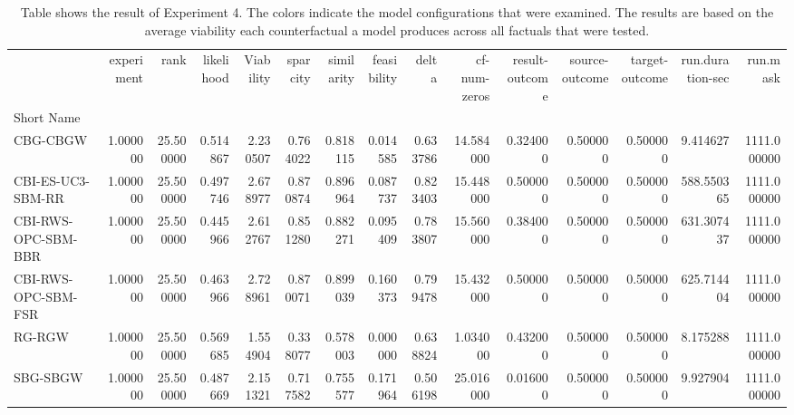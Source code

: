 \begin{table}
\caption{Table shows the result of Experiment 4. The colors indicate the model configurations that were examined. The results are based on the average viability each counterfactual a model produces across all factuals that were tested.}
\label{tbl:exp4-winner}
\begin{tabular}{lrrrrrrrrrrrrrr}
 & experiment & rank & likelihood & Viability & sparcity & similarity & feasibility & delta & cf-num-zeros & result-outcome & source-outcome & target-outcome & run.duration-sec & run.mask \\
Short Name &  &  &  &  &  &  &  &  &  &  &  &  &  &  \\
CBG-CBGW & 1.000000 & 25.500000 & 0.514867 & 2.230507 & 0.764022 & 0.818115 & 0.014585 & 0.633786 & 14.584000 & 0.324000 & 0.500000 & 0.500000 & 9.414627 & 1111.000000 \\
CBI-ES-UC3-SBM-RR & 1.000000 & 25.500000 & 0.497746 & 2.678977 & 0.870874 & 0.896964 & 0.087737 & 0.823403 & 15.448000 & 0.500000 & 0.500000 & 0.500000 & 588.550365 & 1111.000000 \\
CBI-RWS-OPC-SBM-BBR & 1.000000 & 25.500000 & 0.445966 & 2.612767 & 0.851280 & 0.882271 & 0.095409 & 0.783807 & 15.560000 & 0.384000 & 0.500000 & 0.500000 & 631.307437 & 1111.000000 \\
CBI-RWS-OPC-SBM-FSR & 1.000000 & 25.500000 & 0.463966 & 2.728961 & 0.870071 & 0.899039 & 0.160373 & 0.799478 & 15.432000 & 0.500000 & 0.500000 & 0.500000 & 625.714404 & 1111.000000 \\
RG-RGW & 1.000000 & 25.500000 & 0.569685 & 1.554904 & 0.338077 & 0.578003 & 0.000000 & 0.638824 & 1.034000 & 0.432000 & 0.500000 & 0.500000 & 8.175288 & 1111.000000 \\
SBG-SBGW & 1.000000 & 25.500000 & 0.487669 & 2.151321 & 0.717582 & 0.755577 & 0.171964 & 0.506198 & 25.016000 & 0.016000 & 0.500000 & 0.500000 & 9.927904 & 1111.000000 \\
\end{tabular}
\end{table}
